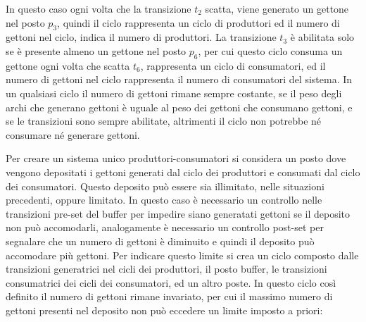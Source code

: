 \documentclass{article}
\numberwithin{equation}{subsection}
\begin{document}
In questo caso ogni volta che la transizione $t_2$ scatta, viene generato un gettone nel posto $p_3$, quindi il ciclo rappresenta un ciclo di produttori ed il numero di 
gettoni nel ciclo, indica il numero di produttori. La transizione $t_3$ è abilitata solo se è presente almeno un gettone nel posto $p_6$, per cui questo ciclo 
consuma un gettone ogni volta che scatta $t_6$, rappresenta un ciclo di consumatori, ed il numero di gettoni nel ciclo rappresenta il numero di consumatori del sistema. 
In un qualsiasi ciclo il numero di gettoni rimane sempre costante, se il peso degli archi che generano gettoni è uguale al peso dei gettoni che consumano gettoni, e se le 
transizioni sono sempre abilitate, altrimenti il ciclo non potrebbe né consumare né generare gettoni. 

Per creare un sistema unico produttori-consumatori si considera un posto dove vengono depositati i gettoni generati dal ciclo dei produttori e consumati dal ciclo dei 
consumatori. Questo deposito può essere sia illimitato, nelle situazioni precedenti, oppure limitato. In questo caso è necessario un controllo nelle transizioni pre-set 
del buffer per impedire siano generatati gettoni se il deposito non può accomodarli, analogamente è necessario un controllo post-set per segnalare che un numero di gettoni è 
diminuito e quindi il deposito può accomodare più gettoni. Per indicare questo limite si crea un ciclo composto dalle transizioni generatrici nel cicli dei produttori, 
il posto buffer, le transizioni consumatrici dei cicli dei consumatori, ed un altro poste. In questo ciclo così definito il numero di gettoni rimane invariato, per cui il 
massimo numero di gettoni presenti nel deposito non può eccedere un limite imposto a priori:
\end{document}
